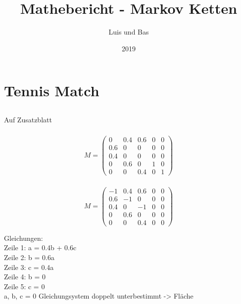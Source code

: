 \documentclass{article}
\title{Mathebericht - Markov Ketten}
\author{Luis und Bas}
\date{2019}
\begin{document}
\maketitle


\section{Tennis Match}
\subsection{}
\subsubsection{} Auf Zusatzblatt
\subsubsection{} 
\[
M=
  \begin{pmatrix}
    0 & 0.4 & 0.6 & 0 & 0 \\
    0.6 & 0 & 0 & 0 & 0 \\
    0.4 & 0 & 0 & 0 & 0 \\
    0 & 0.6 & 0 & 1 & 0 \\
    0 & 0 & 0.4 & 0 & 1
    
  \end{pmatrix}
\]
\subsubsection{}
\[
M=
  \begin{pmatrix}
    -1 & 0.4 & 0.6 & 0 & 0 \\
    0.6 & -1 & 0 & 0 & 0 \\
    0.4 & 0 & -1 & 0 & 0 \\
    0 & 0.6 & 0 & 0 & 0 \\
    0 & 0 & 0.4 & 0 & 0
    
  \end{pmatrix}
\]

\vspace{5mm}
Gleichungen: \\
Zeile 1: a = 0.4b + 0.6c \\
Zeile 2: b = 0.6a \\
Zeile 3: c = 0.4a \\
Zeile 4: b = 0 \\
Zeile 5: c = 0 \\

\vspace{5mm}
a, b, c = 0
Gleichungsystem doppelt unterbestimmt -> Fläche
\end{document}
